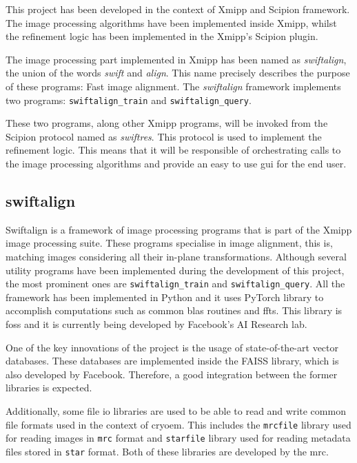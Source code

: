 \documentclass[../main.tex]{subfiles}
\begin{document}
This project has been developed in the context of Xmipp and Scipion framework. The image processing algorithms have been implemented inside Xmipp, whilst the refinement logic has been implemented in the Xmipp's Scipion plugin.

The image processing part implemented in Xmipp has been named as \textit{swiftalign}, the union of the words \textit{swift} and \textit{align}. This name precisely describes the purpose of these programs: Fast image alignment. The \textit{swiftalign} framework implements two programs: \texttt{swiftalign\_train} and \texttt{swiftalign\_query}. 

These two programs, along other Xmipp programs, will be invoked from the Scipion protocol named as \textit{swiftres}. This protocol is used to implement the refinement logic. This means that it will be responsible of orchestrating calls to the image processing algorithms and provide an easy to use \gls{gui} for the end user.

\subsection{swiftalign}
Swiftalign is a framework of image processing programs that is part of the Xmipp image processing suite. These programs specialise in image alignment, this is, matching images considering all their in-plane transformations. Although several utility programs have been implemented during the development of this project, the most prominent ones are \texttt{swiftalign\_train} and \texttt{swiftalign\_query}. All the framework has been implemented in Python and it uses PyTorch library to accomplish computations such as common \gls{blas} routines and \glspl{fft}. This library is \gls{foss} and it is currently being developed by Facebook's AI Research lab. 

One of the key innovations of the project is the usage of state-of-the-art vector databases. These databases are implemented inside the FAISS library, which is also developed by Facebook. Therefore, a good integration between the former libraries is expected. 

Additionally, some file \gls{io} libraries are used to be able to read and write common file formats used in the context of \gls{cryoem}. This includes the \texttt{mrcfile} library used for reading images in \texttt{mrc} format and \texttt{starfile} library used for reading metadata files stored in \texttt{star} format. Both of these libraries are developed by the \gls{mrc}.
\end{document}
